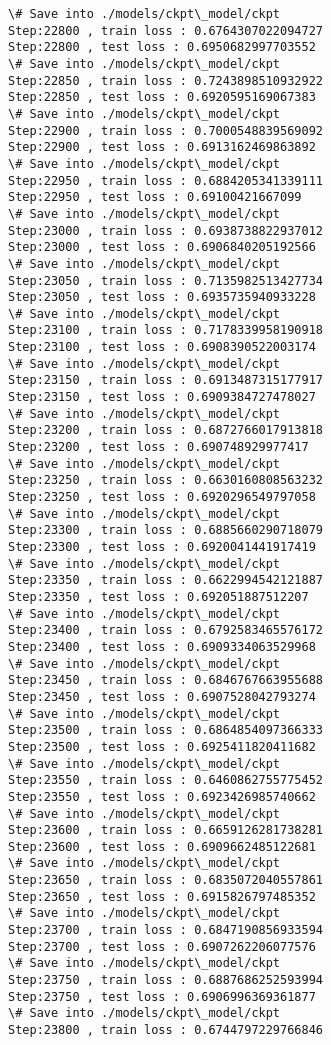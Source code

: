 \documentclass[11pt]{article}
\begin{document}
\begin{Verbatim}[commandchars=\\\{\}]
\# Save into ./models/ckpt\_model/ckpt
Step:22800 , train loss : 0.6764307022094727
Step:22800 , test loss : 0.6950682997703552
\# Save into ./models/ckpt\_model/ckpt
Step:22850 , train loss : 0.7243898510932922
Step:22850 , test loss : 0.6920595169067383
\# Save into ./models/ckpt\_model/ckpt
Step:22900 , train loss : 0.7000548839569092
Step:22900 , test loss : 0.6913162469863892
\# Save into ./models/ckpt\_model/ckpt
Step:22950 , train loss : 0.6884205341339111
Step:22950 , test loss : 0.69100421667099
\# Save into ./models/ckpt\_model/ckpt
Step:23000 , train loss : 0.6938738822937012
Step:23000 , test loss : 0.6906840205192566
\# Save into ./models/ckpt\_model/ckpt
Step:23050 , train loss : 0.7135982513427734
Step:23050 , test loss : 0.6935735940933228
\# Save into ./models/ckpt\_model/ckpt
Step:23100 , train loss : 0.7178339958190918
Step:23100 , test loss : 0.6908390522003174
\# Save into ./models/ckpt\_model/ckpt
Step:23150 , train loss : 0.6913487315177917
Step:23150 , test loss : 0.6909384727478027
\# Save into ./models/ckpt\_model/ckpt
Step:23200 , train loss : 0.6872766017913818
Step:23200 , test loss : 0.690748929977417
\# Save into ./models/ckpt\_model/ckpt
Step:23250 , train loss : 0.6630160808563232
Step:23250 , test loss : 0.6920296549797058
\# Save into ./models/ckpt\_model/ckpt
Step:23300 , train loss : 0.6885660290718079
Step:23300 , test loss : 0.6920041441917419
\# Save into ./models/ckpt\_model/ckpt
Step:23350 , train loss : 0.6622994542121887
Step:23350 , test loss : 0.692051887512207
\# Save into ./models/ckpt\_model/ckpt
Step:23400 , train loss : 0.6792583465576172
Step:23400 , test loss : 0.6909334063529968
\# Save into ./models/ckpt\_model/ckpt
Step:23450 , train loss : 0.6846767663955688
Step:23450 , test loss : 0.6907528042793274
\# Save into ./models/ckpt\_model/ckpt
Step:23500 , train loss : 0.6864854097366333
Step:23500 , test loss : 0.6925411820411682
\# Save into ./models/ckpt\_model/ckpt
Step:23550 , train loss : 0.6460862755775452
Step:23550 , test loss : 0.6923426985740662
\# Save into ./models/ckpt\_model/ckpt
Step:23600 , train loss : 0.6659126281738281
Step:23600 , test loss : 0.6909662485122681
\# Save into ./models/ckpt\_model/ckpt
Step:23650 , train loss : 0.6835072040557861
Step:23650 , test loss : 0.6915826797485352
\# Save into ./models/ckpt\_model/ckpt
Step:23700 , train loss : 0.6847190856933594
Step:23700 , test loss : 0.6907262206077576
\# Save into ./models/ckpt\_model/ckpt
Step:23750 , train loss : 0.6887686252593994
Step:23750 , test loss : 0.6906996369361877
\# Save into ./models/ckpt\_model/ckpt
Step:23800 , train loss : 0.6744797229766846

\end{Verbatim}
\end{document}
